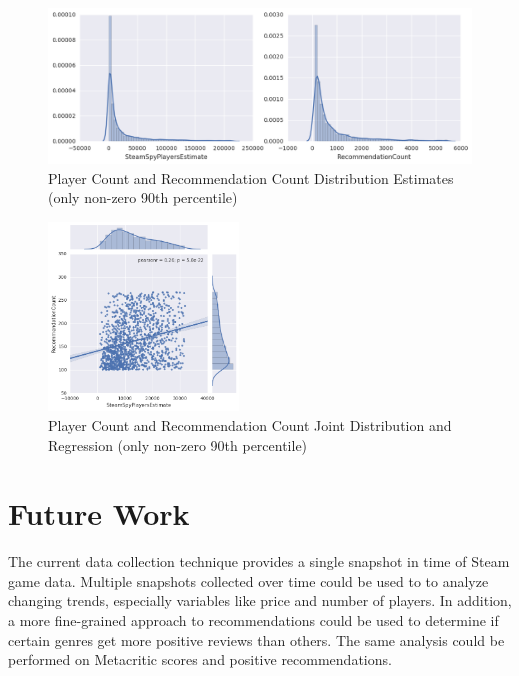 \documentclass[letterpaper,10pt,twocolumn]{article}
\begin{document}
\begin{figure}[h]
    \caption{Player Count and Recommendation Count Distribution Estimates (only non-zero 90th percentile)}
    \label{fig:players-recommendations-dists}
    \includegraphics[width=\textwidth,keepaspectratio]{player-count-recommends-distribution}
\end{figure}

\begin{figure}[h]
    \caption{Player Count and Recommendation Count Joint Distribution and Regression (only non-zero 90th percentile)}
    \label{fig:players-recommendations-jointwithreg}
    \includegraphics[width=0.45\textwidth,keepaspectratio]{player-count-recommends-jointwithreg}
\end{figure}



\section{Future Work}

The current data collection technique provides a single snapshot in time of
Steam game data. Multiple snapshots collected over time could be used to to
analyze changing trends, especially variables like price and number of
players. In addition, a more fine-grained approach to recommendations could be
used to determine if certain genres get more positive reviews than others. The
same analysis could be performed on Metacritic scores and positive
recommendations.
\end{document}
